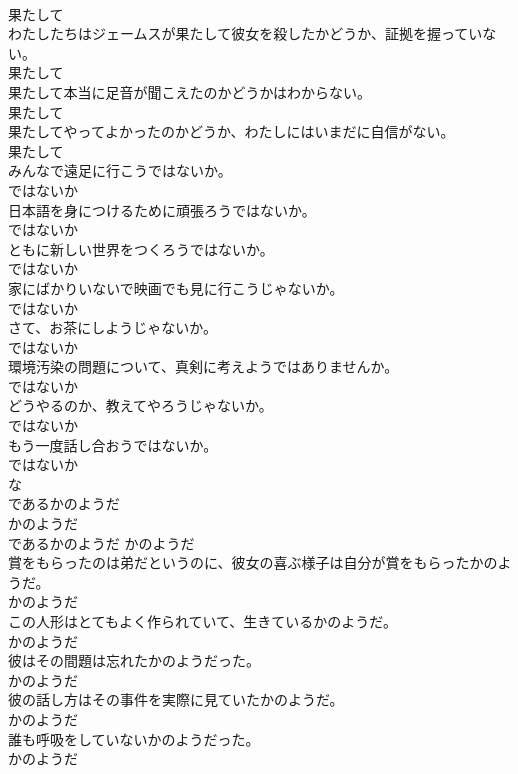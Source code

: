 \documentclass[8pt]{extreport}
\begin{document}
\begin{CJK}{UTF8}{min}
\\	果たして
\\	わたしたちはジェームスが果たして彼女を殺したかどうか、証拠を握っていない。	
\\	果たして
\\	果たして本当に足音が聞こえたのかどうかはわからない。	
\\	果たして
\\	果たしてやってよかったのかどうか、わたしにはいまだに自信がない。	
\\	果たして
\\	みんなで遠足に行こうではないか。	
\\	ではないか
\\	日本語を身につけるために頑張ろうではないか。	
\\	ではないか
\\	ともに新しい世界をつくろうではないか。	
\\	ではないか
\\	家にばかりいないで映画でも見に行こうじゃないか。	
\\	ではないか
\\	さて、お茶にしようじゃないか。	
\\	ではないか
\\	環境汚染の問題について、真剣に考えようではありませんか。	
\\	ではないか
\\	どうやるのか、教えてやろうじゃないか。	
\\	ではないか
\\	もう一度話し合おうではないか。	
\\	ではないか
\\	な
\\	であるかのようだ	
\\	かのようだ	
\\	であるかのようだ	かのようだ
\\	賞をもらったのは弟だというのに、彼女の喜ぶ様子は自分が賞をもらったかのようだ。	
\\	かのようだ
\\	この人形はとてもよく作られていて、生きているかのようだ。	
\\	かのようだ
\\	彼はその間題は忘れたかのようだった。	
\\	かのようだ
\\	彼の話し方はその事件を実際に見ていたかのようだ。	
\\	かのようだ
\\	誰も呼吸をしていないかのようだった。	
\\	かのようだ

\end{CJK}
\end{document}
